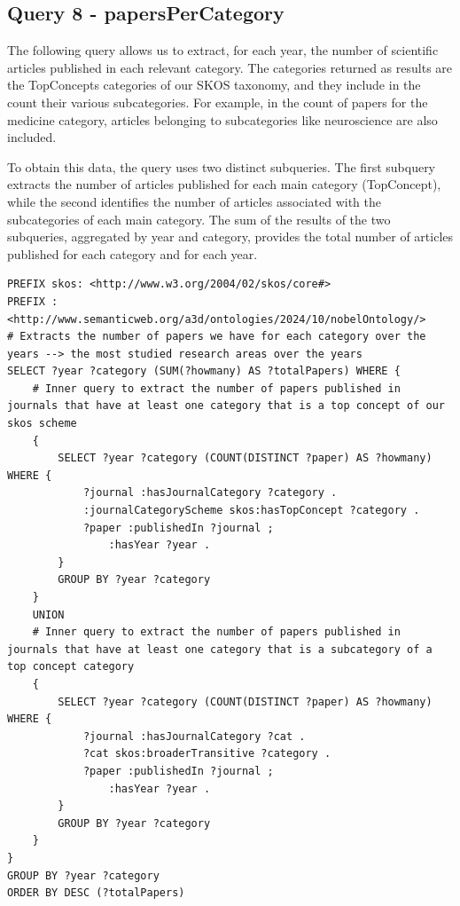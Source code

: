 \documentclass{article}
\begin{document}
\subsection*{Query 8 - papersPerCategory}
The following query allows us to extract, for each year, the number of scientific articles published in each relevant category. The categories returned
as results are the TopConcepts categories of our SKOS taxonomy, and they include in the count their various subcategories. For example, in the count
of papers for the medicine category, articles belonging to subcategories like neuroscience are also included.

\noindent To obtain this data, the query uses two distinct subqueries. The first subquery extracts the number of articles published for each main category
(TopConcept), while the second identifies the number of articles associated with the subcategories of each main category. The sum of the results of
the two subqueries, aggregated by year and category, provides the total number of articles published for each category and for each year.

\begin{lstlisting}
PREFIX skos: <http://www.w3.org/2004/02/skos/core#>
PREFIX : <http://www.semanticweb.org/a3d/ontologies/2024/10/nobelOntology/>
# Extracts the number of papers we have for each category over the years --> the most studied research areas over the years
SELECT ?year ?category (SUM(?howmany) AS ?totalPapers) WHERE {
    # Inner query to extract the number of papers published in journals that have at least one category that is a top concept of our skos scheme
    {
        SELECT ?year ?category (COUNT(DISTINCT ?paper) AS ?howmany) WHERE {
            ?journal :hasJournalCategory ?category .
            :journalCategoryScheme skos:hasTopConcept ?category .
            ?paper :publishedIn ?journal ;
                :hasYear ?year .
        } 
        GROUP BY ?year ?category
    }
    UNION
    # Inner query to extract the number of papers published in journals that have at least one category that is a subcategory of a top concept category
    {
        SELECT ?year ?category (COUNT(DISTINCT ?paper) AS ?howmany) WHERE {
            ?journal :hasJournalCategory ?cat .
            ?cat skos:broaderTransitive ?category .
            ?paper :publishedIn ?journal ;
                :hasYear ?year .
        } 
        GROUP BY ?year ?category
    }
} 
GROUP BY ?year ?category
ORDER BY DESC (?totalPapers)    
\end{lstlisting}
\end{document}
